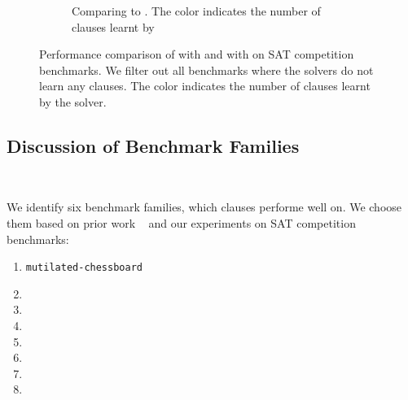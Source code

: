 \begin{figure}[!t]
\begin{subfigure}[t]{0.45\textwidth}
        \caption{Comparing \prelearn to \cadical. The color indicates the number of \pr clauses learnt by \prelearn}
        \label{fig:cautical-vs-prelearn}
    \end{subfigure}
    \caption{Performance comparison of \tool with and \prelearn with \cadical on SAT competition benchmarks. We filter out all benchmarks where the solvers do not learn any \pr clauses. The color indicates the number of \pr clauses learnt by the solver.}
    \label{fig:solver-comparison}
\end{figure}


\subsection{Discussion of Benchmark Families}~\label{subsec:eval-discussion}

We identify six benchmark families, which \pr clauses performe well on. We choose them  based on prior work ~\cite{prelearn} and our experiments on SAT competition benchmarks:

\begin{enumerate}
    \item \texttt{mutilated-chessboard}
    \item 
    \item 
    \item 
    \item 
    \item 
    \item 
    \item 
\end{enumerate}

